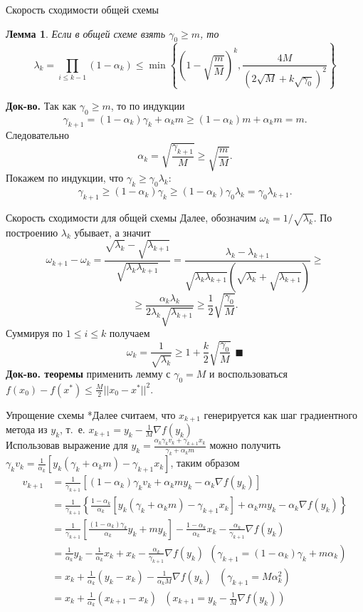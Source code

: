 \documentclass[10pt, handout]{beamer}
\newcounter{lm}
\newtheorem{lemma_ru}[lm]{Лемма}
\begin{document}
\begin{frame}{Скорость сходимости общей схемы}
\begin{lemma_ru}
Если в общей схеме взять $\gamma_0\geq m$, то 
$$
\lambda_k=\prod_{i\leq k-1}(1-\alpha_k)\leq \min\left\{\left(1-\sqrt{\frac{m}{M}}\right)^k, \frac{4M}{(2\sqrt{M}+k\sqrt{\gamma_0})^2}\right\}
$$
\end{lemma_ru}
\pause
\textbf{Док-во.} Так как $\gamma_0\geq m$, то по индукции
$$
\gamma_{k+1}=(1-\alpha_k)\gamma_k+\alpha_km\geq (1-\alpha_k)m+\alpha_km=m.
$$
\pause
Следовательно
$$
\alpha_k=\sqrt{\frac{\gamma_{k+1}}{M}}\geq \sqrt{\frac{m}{M}}.
$$
\pause
Покажем по индукции, что $\gamma_{k}\geq \gamma_0\lambda_k$:
$$
\gamma_{k+1}\geq (1-\alpha_k)\gamma_k\geq(1-\alpha_k)\gamma_0\lambda_k=\gamma_0\lambda_{k+1}.
$$
\end{frame}

\begin{frame}{Скорость сходимости для общей схемы}
Далее, обозначим $\omega_k=1/\sqrt{\lambda_k}$. По построению $\lambda_k$ убывает, а значит
$$
\omega_{k+1}-\omega_k=\frac{\sqrt{\lambda_k}-\sqrt{\lambda_{k+1}}}{\sqrt{\lambda_k\lambda_{k+1}}}=\frac{\lambda_k-\lambda_{k+1}}{\sqrt{\lambda_k\lambda_{k+1}}(\sqrt{\lambda_k}+\sqrt{\lambda_{k+1}})}\geq
$$
\pause
$$
\geq \frac{\alpha_k\lambda_k}{2\lambda_k\sqrt{\lambda_{k+1}}}\geq\frac{1}{2}\sqrt{\frac{\gamma_0}{M}}.
$$
\pause
Суммируя по $1\leq i\leq k$ получаем
$$
\omega_k=\frac{1}{\sqrt{\lambda_k}}\geq 1+ \frac{k}{2}\sqrt{\frac{\gamma_0}{M}}~~\blacksquare
$$
\pause
\textbf{Док-во. теоремы} применить лемму с $\gamma_0=M$ и воспользоваться $f(x_0)-f(x^*)\leq \frac{M}{2}||x_0-x^*||^2$.
\end{frame}

\begin{frame}{Упрощение схемы}
*Далее считаем, что $x_{k+1}$ генерируется как шаг градиентного метода из $y_k$, т.~е. $x_{k+1}=y_k-\frac{1}{M}\nabla f(y_k)$\\
\vspace{1em}
\pause
Использовав выражение для $y_k=\frac{\alpha_k\gamma_kv_k+\gamma_{k+1}x_k}{\gamma_k+\alpha_km}$ можно получить $\gamma_kv_k=\frac{1}{\alpha_k}[y_k(\gamma_k+\alpha_km)-\gamma_{k+1}x_k]$, таким образом
\begin{align*}
v_{k+1}&=\frac{1}{\gamma_{k+1}}[(1-\alpha_k)\gamma_kv_k+\alpha_kmy_k-\alpha_k\nabla f(y_k)]\\
&=\frac{1}{\gamma_{k+1}}\left\{\frac{1-\alpha_k}{\alpha_k}\left[y_k(\gamma_k+\alpha_km)-\gamma_{k+1}x_k\right]+\alpha_kmy_k-\alpha_k\nabla f(y_k)\right\}\\
&=\frac{1}{\gamma_{k+1}}\left[\frac{(1-\alpha_k)\gamma_k}{\alpha_k}y_k+my_k\right]-\frac{1-\alpha_k}{\alpha_k}x_k-\frac{\alpha_k}{\gamma_{k+1}}\nabla f(y_k)\\
&=\frac{1}{\alpha_k}y_k-\frac{1}{\alpha_k}x_k+x_k-\frac{\alpha_k}{\gamma_{k+1}}\nabla f(y_k)~~(\gamma_{k+1}=(1-\alpha_k)\gamma_k+m\alpha_k)\\
&=x_k+\frac{1}{\alpha_k}(y_k-x_k)-\frac{1}{\alpha_kM}\nabla f(y_k)~~~(\gamma_{k+1}=M\alpha_k^2)\\
&=x_k+\frac{1}{\alpha_k}(x_{k+1}-x_k)~~~(x_{k+1}=y_k-\frac{1}{M}\nabla f(y_k))
\end{align*}
\end{frame} 
\end{document}
